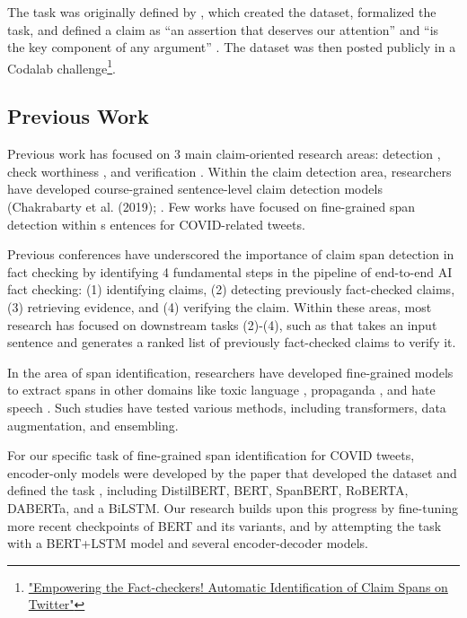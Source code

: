 \documentclass[11pt]{article}
\begin{document}
The task was originally defined by \cite{empowering-the-fact-checkers}, which created the dataset, formalized the task, and defined a claim as “an assertion that deserves our attention” \cite{claim-definition-1} and “is the key component of any argument” \cite{claim-definition-2}. The dataset was then posted publicly in a Codalab challenge\footnote{\href{https://codalab.lisn.upsaclay.fr/competitions/13099}{"Empowering the Fact-checkers! Automatic Identification of Claim Spans on Twitter"}}.

\subsection{Previous Work}

Previous work has focused on 3 main claim-oriented research areas: detection \cite{detection-research-area}, check worthiness \cite{check-worthiness}, and verification \cite{verification}. Within the claim detection area, researchers have developed course-grained sentence-level claim detection models (Chakrabarty et al. (2019); \cite{detection-research-area, claim-detection}. Few works have focused on fine-grained span detection within s entences for COVID-related tweets.

Previous conferences \cite{conference-pipeline} have underscored the importance of claim span detection in fact checking by identifying 4 fundamental steps in the pipeline of end-to-end AI fact checking: (1) identifying claims, (2) detecting previously fact-checked claims, (3) retrieving evidence, and (4) verifying the claim. Within these areas, most research has focused on downstream tasks (2)-(4), such as \cite{downstream-tasks} that takes an input sentence and generates a ranked list of previously fact-checked claims to verify it.

In the area of span identification, researchers have developed fine-grained models to extract spans in other domains like toxic language \cite{toxic-language}, propaganda \cite{propaganda}, and hate speech \cite{hate-speech}. Such studies have tested various methods, including transformers, data augmentation, and ensembling.

For our specific task of fine-grained span identification for COVID tweets, encoder-only models were developed by the paper that developed the dataset and defined the task \cite{empowering-the-fact-checkers}, including DistilBERT, BERT, SpanBERT, RoBERTA, DABERTa, and a BiLSTM. Our research builds upon this progress by fine-tuning more recent checkpoints of BERT and its variants, and by attempting the task with a BERT+LSTM model and several encoder-decoder models.
\end{document}

